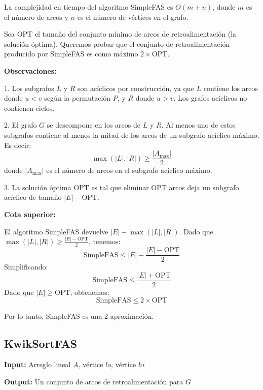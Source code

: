 \documentclass{article}
\begin{document}
La complejidad en tiempo del algoritmo SimpleFAS es $O(m + n)$, donde $m$ es el número de arcos y $n$ es el número de vértices en el grafo.


Sea \(\text{OPT}\) el tamaño del conjunto mínimo de arcos de retroalimentación (la solución óptima). Queremos probar que el conjunto de retroalimentación producido por SimpleFAS es como máximo \(2 \times \text{OPT}\).

\textbf{Observaciones:}

1. Los subgrafos \(L\) y \(R\) son acíclicos por construcción, ya que \(L\) contiene los arcos donde \(u < v\) según la permutación \(P\), y \(R\) donde \(u > v\). Los grafos acíclicos no contienen ciclos.

2. El grafo \(G\) se descompone en los arcos de \(L\) y \(R\). Al menos uno de estos subgrafos contiene al menos la mitad de los arcos de un subgrafo acíclico máximo. Es decir:
   \[
   \max(|L|, |R|) \geq \frac{|A_{\text{max}}|}{2}
   \]
   donde \( |A_{\text{max}}| \) es el número de arcos en el subgrafo acíclico máximo.

3. La solución óptima \( \text{OPT} \) es tal que eliminar \( \text{OPT} \) arcos deja un subgrafo acíclico de tamaño \( |E| - \text{OPT} \).

\textbf{Cota superior:}

El algoritmo SimpleFAS devuelve \( |E| - \max(|L|, |R|) \). Dado que \( \max(|L|, |R|) \geq \frac{|E| - \text{OPT}}{2} \), tenemos:
\[
\text{SimpleFAS} \leq |E| - \frac{|E| - \text{OPT}}{2}
\]
Simplificando:
\[
\text{SimpleFAS} \leq \frac{|E| + \text{OPT}}{2}
\]
Dado que \( |E| \geq \text{OPT} \), obtenemos:
\[
\text{SimpleFAS} \leq 2 \times \text{OPT}
\]

Por lo tanto, SimpleFAS es una 2-aproximación.


\subsection{KwikSortFAS}
\textbf{Input:} Arreglo lineal \(A\), vértice \(lo\), vértice \(hi\)

\textbf{Output:} Un conjunto de arcos de retroalimentación para \(G\)
\end{document}

